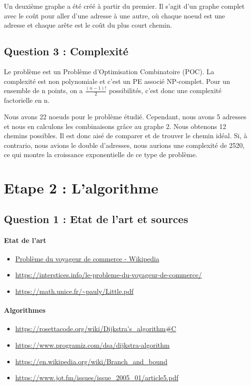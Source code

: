     Un deuxième graphe a été créé à partir du premier. Il s'agit d'un graphe complet avec le coût pour aller d'une adresse à une autre, où chaque noeud est une adresse et chaque arête est le coût du plus court chemin.

  \subsection{Question 3 : Complexité}
    Le problème est un Problème d'Optimisation Combinatoire (POC). La complexité est non polynomiale et c'est un PE associé NP-complet.
    Pour un ensemble de n points, on a $\frac{(n-1)!}{2}$ possibilités, c'est donc une complexité factorielle en n.

    Nous avons 22 noeuds pour le problème étudié. Cependant, nous avons 5 adresses et nous en calculons les combinaisons grâce au graphe 2. Nous obtenons 12 chemins possibles. Il est donc aisé de comparer et de trouver le chemin idéal. Si, à contrario, nous avions le double d'adresses, nous aurions une complexité de 2520, ce qui montre la croissance exponentielle de ce type de problème.

    \newpage


\section{Etape 2 : L'algorithme}

  \subsection{Question 1 : Etat de l'art et sources}
    \paragraph{Etat de l'art}
    \begin{itemize}
     \item \href{https://fr.wikipedia.org/wiki/Probl%C3%A8me_du_voyageur_de_commerce#:~:text=En%20informatique,%20le%20probl%C3%A8me%20du,une%20et%20une%20seule%20fois.}{Problème du voyageur de commerce - Wikipedia}
     \item \url{https://interstices.info/le-probleme-du-voyageur-de-commerce/}
     \item \url{https://math.unice.fr/~pauly/Little.pdf}
    \end{itemize}

    \paragraph{Algorithmes}
    \begin{itemize}
     \item \url{https://rosettacode.org/wiki/Dijkstra's_algorithm#C}
     \item \url{https://www.programiz.com/dsa/dijkstra-algorithm}
     \item \url{https://en.wikipedia.org/wiki/Branch_and_bound}
     \item \url{https://www.jot.fm/issues/issue_2005_01/article5.pdf}
    \end{itemize}

